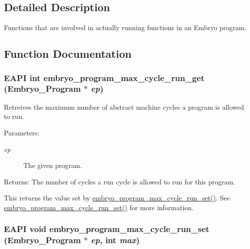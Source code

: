\subsection{Detailed Description}
Functions that are involved in actually running functions in an Embryo program. 



\subsection{Function Documentation}
\hypertarget{group__Embryo__Run__Group_g2bf3e76b53faadccc60c11093c795425}{
\subsubsection{\setlength{\rightskip}{0pt plus 5cm}EAPI int embryo\_\-program\_\-max\_\-cycle\_\-run\_\-get (Embryo\_\-Program $\ast$ {\em ep})}}
\label{group__Embryo__Run__Group_g2bf3e76b53faadccc60c11093c795425}


Retreives the maximum number of abstract machine cycles a program is allowed to run. 

\begin{Desc}
\item[Parameters:]
\begin{description}
\item[{\em ep}]The given program. \end{description}
\end{Desc}
\begin{Desc}
\item[Returns:]The number of cycles a run cycle is allowed to run for this program.\end{Desc}
This returns the value set by \hyperlink{group__Embryo__Run__Group_g493d2e507082b46cdbc57708a1f6e239}{embryo\_\-program\_\-max\_\-cycle\_\-run\_\-set()}. See \hyperlink{group__Embryo__Run__Group_g493d2e507082b46cdbc57708a1f6e239}{embryo\_\-program\_\-max\_\-cycle\_\-run\_\-set()} for more information. \hypertarget{group__Embryo__Run__Group_g493d2e507082b46cdbc57708a1f6e239}{
\subsubsection{\setlength{\rightskip}{0pt plus 5cm}EAPI void embryo\_\-program\_\-max\_\-cycle\_\-run\_\-set (Embryo\_\-Program $\ast$ {\em ep}, \/  int {\em max})}}
\label{group__Embryo__Run__Group_g493d2e507082b46cdbc57708a1f6e239}


